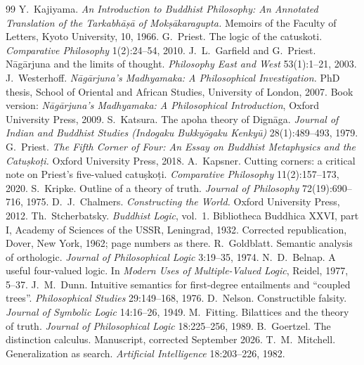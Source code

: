 \documentclass[11pt]{article}
\theoremstyle{plain}
\theoremstyle{definition}
\begin{document}
\begin{thebibliography}{99}
 Y.~Kajiyama. \emph{An Introduction to Buddhist Philosophy: An Annotated
Translation of the Tarkabhāṣā of Mokṣākaragupta.} Memoirs of the Faculty of Letters, Kyoto
University, 10, 1966.
 G.~Priest. The logic of the catuskoti. \emph{Comparative Philosophy}
1(2):24--54, 2010.
 J.~L.~Garfield and G.~Priest. Nāgārjuna and the limits of thought.
\emph{Philosophy East and West} 53(1):1--21, 2003.
 J.~Westerhoff. \emph{Nāgārjuna's Madhyamaka: A Philosophical
Investigation.} PhD thesis, School of Oriental and African Studies, University of London,
2007. Book version: \emph{Nāgārjuna's Madhyamaka: A Philosophical Introduction}, Oxford
University Press, 2009.
 S.~Katsura. The apoha theory of Dignāga. \emph{Journal of Indian and
Buddhist Studies (Indogaku Bukkyōgaku Kenkyū)} 28(1):489--493, 1979.
 G.~Priest. \emph{The Fifth Corner of Four: An Essay on Buddhist
Metaphysics and the Catuṣkoṭi.} Oxford University Press, 2018.
 A.~Kapsner. Cutting corners: a critical note on Priest's five-valued
catuṣkoṭi. \emph{Comparative Philosophy} 11(2):157--173, 2020.
 S.~Kripke. Outline of a theory of truth. \emph{Journal of Philosophy}
72(19):690--716, 1975.
 D.~J.~Chalmers. \emph{Constructing the World.} Oxford University
Press, 2012.
 Th.~Stcherbatsky. \emph{Buddhist Logic}, vol.~1. Bibliotheca
Buddhica XXVI, part I, Academy of Sciences of the USSR, Leningrad, 1932. Corrected
republication, Dover, New York, 1962; page numbers as there.
 R.~Goldblatt. Semantic analysis of orthologic. \emph{Journal of
Philosophical Logic} 3:19--35, 1974.
 N.~D.~Belnap. A useful four-valued logic. In \emph{Modern Uses of
Multiple-Valued Logic}, Reidel, 1977, 5--37.
 J.~M.~Dunn. Intuitive semantics for first-degree entailments and ``coupled
trees''. \emph{Philosophical Studies} 29:149--168, 1976.
 D.~Nelson. Constructible falsity. \emph{Journal of Symbolic Logic}
14:16--26, 1949.
 M.~Fitting. Bilattices and the theory of truth. \emph{Journal of
Philosophical Logic} 18:225--256, 1989.
 B.~Goertzel. The distinction calculus. Manuscript, corrected
September 2026.
 T.~M.~Mitchell. Generalization as search. \emph{Artificial
Intelligence} 18:203--226, 1982.
\end{thebibliography}
\end{document}
